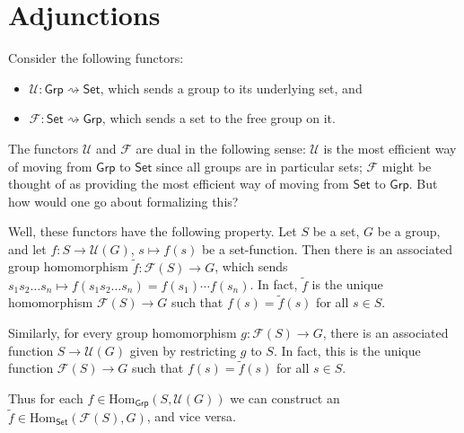 \documentclass[a4paper]{report}
\newcommand{\Hom}{\mathrm{Hom}}
\theoremstyle{definition}
\theoremstyle{plain}
\theoremstyle{remark}
\begin{document}
\section{Adjunctions} \label{sec:adjunctions}
Consider the following functors:
\begin{itemize}
  \item $\mathcal{U}\colon \mathsf{Grp} \rightsquigarrow \mathsf{Set}$, which sends a group to its underlying set, and

  \item $\mathcal{F}\colon \mathsf{Set} \rightsquigarrow \mathsf{Grp}$, which sends a set to the free group on it.
\end{itemize}

The functors $\mathcal{U}$ and $\mathcal{F}$ are dual in the following sense: $\mathcal{U}$ is the most efficient way of moving from $\mathsf{Grp}$ to $\mathsf{Set}$ since all groups are in particular sets; $\mathcal{F}$ might be thought of as providing the most efficient way of moving from $\mathsf{Set}$ to $\mathsf{Grp}$. But how would one go about formalizing this?

Well, these functors have the following property. Let $S$ be a set, $G$ be a group, and let $f\colon S \to \mathcal{U}(G)$, $s \mapsto f(s)$ be a set-function. Then there is an associated group homomorphism $\tilde{f}\colon \mathcal{F}(S) \to G$, which sends $s_{1}s_{2}\dots s_{n} \mapsto f(s_{1}s_{2}\dots s_{n}) = f(s_{1})\cdots f(s_{n})$. In fact, $\tilde{f}$ is the unique homomorphism $\mathcal{F}(S) \to G$ such that $f(s) = \tilde{f}(s)$ for all $s \in S$. 

Similarly, for every group homomorphism $g\colon \mathcal{F}(S) \to G$, there is an associated function $S \to \mathcal{U}(G)$ given by restricting $g$ to $S$. In fact, this is the unique function $\mathcal{F}(S) \to G$ such that $f(s) = \tilde{f}(s)$ for all $s \in S$.

Thus for each $f \in \Hom_{\mathsf{Grp}}(S, \mathcal{U}(G))$ we can construct an $\tilde{f} \in \Hom_{\mathsf{Set}}(\mathcal{F}(S), G)$, and vice versa.
\end{document}
